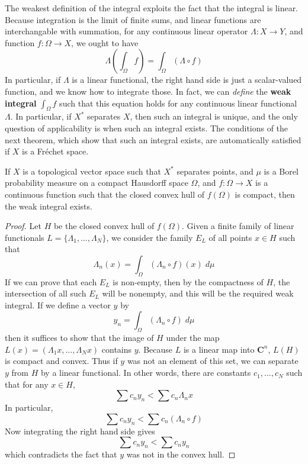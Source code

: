 The weakest definition of the integral exploits the fact that the integral is linear. Because integration is the limit of finite sums, and linear functions are interchangable with summation, for any continuous linear operator $\Lambda: X \to Y$, and function $f: \Omega \to X$, we ought to have
%
\[ \Lambda \left( \int_\Omega f \right) = \int_\Omega (\Lambda \circ f) \]
%
In particular, if $\Lambda$ is a linear functional, the right hand side is just a scalar-valued function, and we know how to integrate those. In fact, we can {\it define} the {\bf weak integral} $\int_\Omega f$ such that this equation holds for any continuous linear functional $\Lambda$. In particular, if $X^*$ separates $X$, then such an integral is unique, and the only question of applicability is when such an integral exists. The conditions of the next theorem, which show that such an integral exists, are automatically satisfied if $X$ is a Fr\'{e}chet space.

\begin{theorem}
    If $X$ is a topological vector space such that $X^*$ separates points, and $\mu$ is a Borel probability measure on a compact Hausdorff space $\Omega$, and $f: \Omega \to X$ is a continuous function such that the closed convex hull of $f(\Omega)$ is compact, then the weak integral exists.
\end{theorem}
\begin{proof}
    Let $H$ be the closed convex hull of $f(\Omega)$. Given a finite family of linear functionals $L = \{ \Lambda_1, \dots, \Lambda_N \}$, we consider the family $E_L$ of all points $x \in H$ such that
    \[ \Lambda_n(x) = \int_\Omega (\Lambda_n \circ f)(x)\; d\mu \]
    If we can prove that each $E_L$ is non-empty, then by the compactness of $H$, the intersection of all such $E_L$ will be nonempty, and this will be the required weak integral. If we define a vector $y$ by
    \[ y_n = \int_\Omega (\Lambda_n \circ f)\; d\mu \]
    then it suffices to show that the image of $H$ under the map $L(x) = (\Lambda_1 x, \dots, \Lambda_N x)$ contains $y$. Because $L$ is a linear map into $\mathbf{C}^n$, $L(H)$ is compact and convex. Thus if $y$ was not an element of this set, we can separate $y$ from $H$ by a linear functional. In other words, there are constants $c_1, \dots, c_N$ such that for any $x \in H$,
    \[ \sum c_n y_n < \sum c_n \Lambda_n x \]
    In particular,
    \[ \sum c_n y_n < \sum c_n (\Lambda_n \circ f) \]
    Now integrating the right hand side gives
    \[ \sum c_n y_n < \sum c_n y_n \]
    which contradicts the fact that $y$ was not in the convex hull.
\end{proof}

